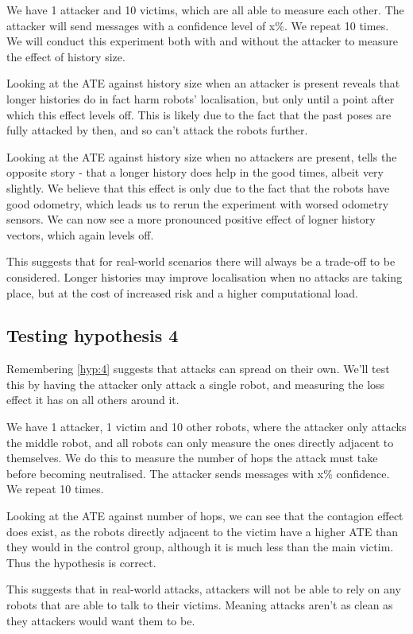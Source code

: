 We have 1 attacker and 10 victims, which are all able to measure each other. The attacker will send messages with a confidence level of x\%. We repeat 10 times. We will conduct this experiment both with and without the attacker to measure the effect of history size.

Looking at the ATE against history size when an attacker is present reveals that longer histories do in fact harm robots' localisation, but only until a point after which this effect levels off. This is likely due to the fact that the past poses are fully attacked by then, and so can't attack the robots further.

Looking at the ATE against history size when no attackers are present, tells the opposite story - that a longer history does help in the good times, albeit very slightly. We believe that this effect is only due to the fact that the robots have good odometry, which leads us to rerun the experiment with worsed odometry sensors. We can now see a more pronounced positive effect of logner history vectors, which again levels off.

This suggests that for real-world scenarios there will always be a trade-off to be considered. Longer histories may improve localisation when no attacks are taking place, but at the cost of increased risk and a higher computational load.

\subsection{Testing hypothesis 4}
Remembering \ref{hyp:4} suggests that attacks can spread on their own. We'll test this by having the attacker only attack a single robot, and measuring the loss effect it has on all others around it.

We have 1 attacker, 1 victim and 10 other robots, where the attacker only attacks the middle robot, and all robots can only measure the ones directly adjacent to themselves. We do this to measure the number of hops the attack must take before becoming neutralised. The attacker sends messages with x\% confidence. We repeat 10 times.

Looking at the ATE against number of hops, we can see that the contagion effect does exist, as the robots directly adjacent to the victim have a higher ATE than they would in the control group, although it is much less than the main victim. Thus the hypothesis is correct.

This suggests that in real-world attacks, attackers will not be able to rely on any robots that are able to talk to their victims. Meaning attacks aren't as clean as they attackers would want them to be.

